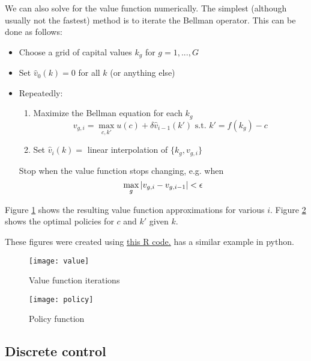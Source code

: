 \begin{example} 
  We can also solve for the value function numerically. The simplest
  (although usually not the fastest) method is to iterate the Bellman
  operator. This can be done as follows:
  \begin{itemize}
  \item Choose a grid of capital values $k_g$ for $g=1,..., G$
  \item Set $\hat{v}_0(k) = 0$ for all $k$ (or anything else)
  \item Repeatedly:
    \begin{enumerate}
    \item Maximize the Bellman equation for each $k_g$
      \[ v_{g,i} = \max_{c,k'} u(c) + \delta \hat{v}_{i-1}(k') \text{ s.t. } k' = f(k_g)
      - c \]
    \item Set $\hat{v}_{i} (k) = $ linear interpolation of $\{k_g,
      v_{g,i} \}$
    \end{enumerate}
    Stop when the value function stops changing, e.g. when 
    \[ \max_{g} \left\vert {v_{g,i} - v_{g,i-1} } \right\vert < \epsilon \]
  \end{itemize}
  
  Figure \ref{fig:value} shows the resulting value function
  approximations for various $i$.  Figure \ref{fig:policy} shows the
  optimal policies for $c$ and $k'$ given $k$. 
  
  These figures were created using
  \href{https://bitbucket.org/paulschrimpf/econ526/src/master/03-dynamicProgramming/dp.R?at=master}
  {this R code.}
  \cite{sargent2013} has a similar example in python.   
\end{example}

\begin{figure}\caption{Value function iterations \label{fig:value}}
  \begin{centering}
    \texttt{[image: value]}
  \end{centering}
\end{figure}

\begin{figure}\caption{Policy function \label{fig:policy}}
  \begin{centering}
    \texttt{[image: policy]}
  \end{centering}
\end{figure}

\clearpage
\subsection{Discrete control}
  

